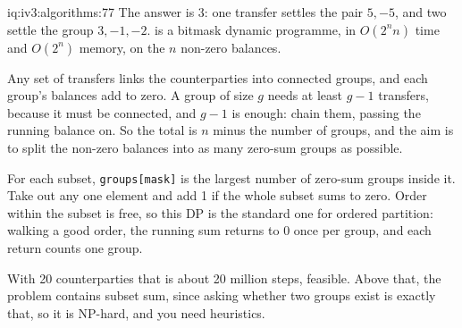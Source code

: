 \begin{solution}{iq:iv3:algorithms:77}
The answer is 3: one transfer settles the pair $5, -5$, and two settle the group $3, -1, -2$.  is a bitmask dynamic programme, in $O(2^n n)$ time and $O(2^n)$ memory, on the $n$ non-zero balances.
\label{lst:iv3:al:settle}

Any set of transfers links the counterparties into connected groups, and each group's balances add to zero. A group of size $g$ needs at least $g - 1$ transfers, because it must be connected, and $g - 1$ is enough: chain them, passing the running balance on. So the total is $n$ minus the number of groups, and the aim is to split the non-zero balances into as many zero-sum groups as possible.

For each subset, \texttt{groups[mask]} is the largest number of zero-sum groups inside it. Take out any one element and add 1 if the whole subset sums to zero. Order within the subset is free, so this DP is the standard one for ordered partition: walking a good order, the running sum returns to 0 once per group, and each return counts one group.

With 20 counterparties that is about 20 million steps, feasible. Above that, the problem contains subset sum, since asking whether two groups exist is exactly that, so it is NP-hard, and you need heuristics.

\end{solution}

